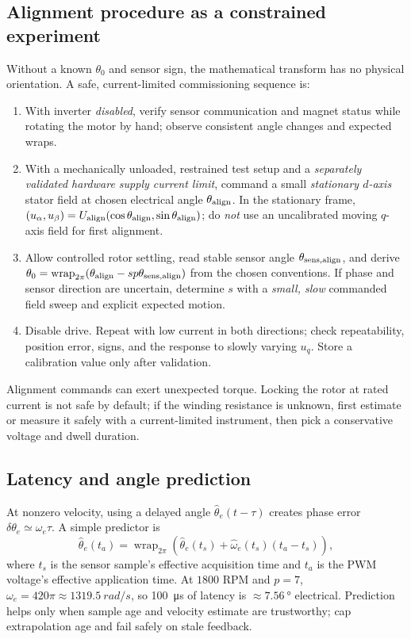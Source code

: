 \documentclass[10pt,letterpaper]{article}
\newcommand{\wrap}{\operatorname{wrap}_{2\pi}}
\begin{document}
\subsection{Alignment procedure as a constrained experiment}
Without a known $\theta_0$ and sensor sign, the mathematical transform has no physical orientation. A safe, current-limited commissioning sequence is:
\begin{enumerate}
\item With inverter \emph{disabled}, verify sensor communication and magnet status while rotating the motor by hand; observe consistent angle changes and expected wraps.
\item With a mechanically unloaded, restrained test setup and a \emph{separately validated hardware supply current limit}, command a small \emph{stationary $d$-axis} stator field at chosen electrical angle $\theta_{\rm align}$. In the stationary frame, $(u_\alpha,u_\beta)=U_{\rm align}(\cos\theta_{\rm align},\sin\theta_{\rm align})$; do \emph{not} use an uncalibrated moving $q$-axis field for first alignment.
\item Allow controlled rotor settling, read stable sensor angle $\theta_{\rm sens,align}$, and derive $\theta_0=\wrap(\theta_{\rm align}-sp\theta_{\rm sens,align})$ from the chosen conventions. If phase and sensor direction are uncertain, determine $s$ with a \emph{small, slow} commanded field sweep and explicit expected motion.
\item Disable drive. Repeat with low current in both directions; check repeatability, position error, signs, and the response to slowly varying $u_q$. Store a calibration value only after validation.
\end{enumerate}
Alignment commands can exert unexpected torque. Locking the rotor at rated current is not safe by default; if the winding resistance is unknown, first estimate or measure it safely with a current-limited instrument, then pick a conservative voltage and dwell duration.

\subsection{Latency and angle prediction}
At nonzero velocity, using a delayed angle $\hat\theta_e(t-\tau)$ creates phase error $\delta\theta_e\simeq\omega_e\tau$. A simple predictor is
\begin{equation}\label{eq:lead}
\hat\theta_e(t_a)=\wrap\left(\hat\theta_e(t_s)+\hat\omega_e(t_s)(t_a-t_s)\right),
\end{equation}
where $t_s$ is the sensor sample's effective acquisition time and $t_a$ is the PWM voltage's effective application time. At $1800$ RPM and $p=7$, $\omega_e=420\pi\approx\SI{1319.5}{rad/s}$, so \SI{100}{\micro\second} of latency is $\approx\SI{7.56}{\degree}$ electrical. Prediction helps only when sample age and velocity estimate are trustworthy; cap extrapolation age and fail safely on stale feedback.
\end{document}
